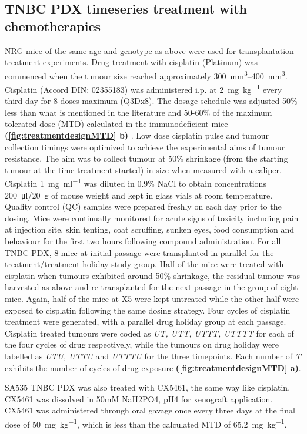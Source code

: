 \subsection{TNBC PDX timeseries treatment with chemotherapies}
\label{ssec:rx}
NRG mice of the same age and genotype as above were used for transplantation treatment experiments. Drug treatment with cisplatin (Platinum) was commenced when the tumour size reached approximately \SIrange{300}{400}{\mm\cubed}. Cisplatin (Accord DIN: 02355183)  was administered i.p. at \SI{2}{\mg\per\kg} every third day for 8 doses maximum (Q3Dx8). The dosage schedule was adjusted 50\% less than what is mentioned in the literature \cite{li2013enhanced,wang2013klotho} and 50-60\%  of the maximum tolerated dose (MTD) calculated in the immunodeficient mice  \textbf{(\autoref{fig:treatmentdesignMTD} b)} . Low dose cisplatin pulse and tumour collection timings were optimized to achieve the experimental aims of tumour resistance. The aim was to collect tumour at 50\% shrinkage (from the starting tumour at the time treatment started) in size when measured with a caliper. Cisplatin \SI{1}{\mg\per\ml} was diluted in 0.9\% NaCl to obtain concentrations \SI{200}{\ul}/\SI{20}{\g} of mouse weight and kept in glass vials at room temperature. Quality control (QC) samples were prepared freshly on each day prior to the dosing. Mice were continually monitored for acute signs of toxicity including pain at injection site, skin tenting, coat scruffing, sunken eyes, food consumption and behaviour for the first two hours following compound administration. For all TNBC PDX, 8 mice at initial passage were transplanted in parallel for the treatment/treatment holiday study group. Half of the mice were treated with cisplatin when tumours exhibited around 50\% shrinkage, the residual tumour was harvested as above and re-transplanted for the next passage in the group of eight mice. Again, half of the mice at X5 were kept untreated while the other half were exposed to cisplatin following the same dosing strategy. Four cycles of cisplatin treatment were generated, with a parallel drug holiday group at each passage. Cisplatin treated tumours were coded as \textit{UT, UTT, UTTT, UTTTT} for each of the four cycles of drug respectively, while the tumours on drug holiday were labelled as \textit{UTU, UTTU} and \textit{UTTTU} for the three timepoints. Each number of \textit{T} exhibits the number of cycles of drug exposure \textbf{(\autoref{fig:treatmentdesignMTD} a)}. 

SA535 TNBC PDX was also treated with CX5461, the same way like cisplatin. CX5461 was dissolved in 50mM NaH2PO4, pH4 for xenograft application. CX5461 was administered through oral gavage once every three days at the final dose of \SI{50}{\mg\per\kg}, which is less than the calculated MTD of \SI{65.2}{\mg\per\kg}.

